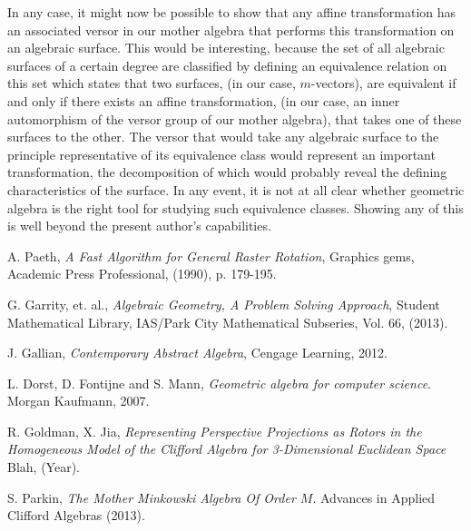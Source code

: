 \documentclass{birkjour}
\theoremstyle{definition}
\theoremstyle{remark}
\numberwithin{equation}{section}
\begin{document}
In any case, it might now be possible to show that any affine transformation
has an associated versor in our mother algebra that performs
this transformation on an algebraic surface.  This would be interesting,
because the set of all algebraic surfaces of a certain degree are classified by defining an
equivalence relation on this set which states that two surfaces, (in our case, $m$-vectors),
are equivalent if and only if there exists an affine transformation, (in our case, an inner
automorphism of the versor group of our mother algebra), that takes one of these
surfaces to the other.  The versor that would take any algebraic surface to the
principle representative of its equivalence class would represent an important transformation,
the decomposition of which would probably reveal the defining characteristics of the surface.
In any event, it is not at all clear
whether geometric algebra is the right tool for studying such equivalence classes.
Showing any of this is well beyond the present author's capabilities.

\begin{thebibliography}{9}

A. Paeth, {\it A Fast Algorithm for General Raster Rotation},
Graphics gems, Academic Press Professional, (1990), p. 179-195.

G. Garrity, et. al., {\it Algebraic Geometry, A Problem Solving Approach},
Student Mathematical Library, IAS/Park City Mathematical Subseries, Vol. 66, (2013).

J. Gallian, {\it Contemporary Abstract Algebra}, Cengage Learning, 2012.

L. Dorst, D. Fontijne and S. Mann, {\it Geometric algebra for computer
science}. Morgan Kaufmann, 2007.

R. Goldman, X. Jia, {\it Representing Perspective Projections as Rotors
in the Homogeneous Model of the Clifford Algebra for 3-Dimensional Euclidean Space}
Blah, (Year).

S. Parkin, {\it The Mother Minkowski Algebra Of Order $M$}.
Advances in Applied Clifford Algebras (2013).

\end{thebibliography}
\end{document}
